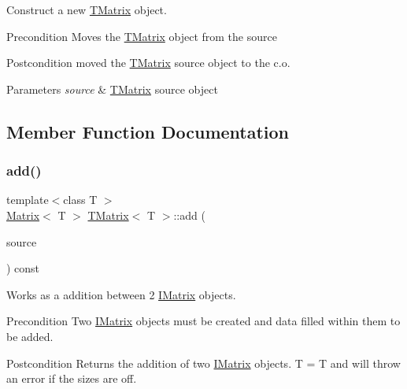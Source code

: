 Construct a new \mbox{\hyperlink{class_t_matrix}{T\+Matrix}} object. 

\begin{DoxyPrecond}{Precondition}
Moves the \mbox{\hyperlink{class_t_matrix}{T\+Matrix}} object from the source 
\end{DoxyPrecond}
\begin{DoxyPostcond}{Postcondition}
moved the \mbox{\hyperlink{class_t_matrix}{T\+Matrix}} source object to the c.\+o.
\end{DoxyPostcond}

\begin{DoxyParams}{Parameters}
{\em source} & \mbox{\hyperlink{class_t_matrix}{T\+Matrix}} source object \\
\hline
\end{DoxyParams}


\subsection{Member Function Documentation}
\mbox{\label{class_t_matrix_a42bd72d405febbf7edcc225a79935800}} 
\subsubsection{\texorpdfstring{add()}{add()}\hspace{0.1cm}{\footnotesize\ttfamily [1/6]}}
{\footnotesize\ttfamily template$<$class T $>$ \\
\mbox{\hyperlink{class_matrix}{Matrix}}$<$ T $>$ \mbox{\hyperlink{class_t_matrix}{T\+Matrix}}$<$ T $>$\+::add (\begin{DoxyParamCaption}\item[{const \mbox{\hyperlink{class_i_matrix}{I\+Matrix}}$<$ \mbox{\hyperlink{class_matrix}{Matrix}}$<$ T $>$, T $>$ \&}]{source }\end{DoxyParamCaption}) const}



Works as a addition between 2 \mbox{\hyperlink{class_i_matrix}{I\+Matrix}} objects. 

\begin{DoxyPrecond}{Precondition}
Two \mbox{\hyperlink{class_i_matrix}{I\+Matrix}} objects must be created and data filled within them to be added. 
\end{DoxyPrecond}
\begin{DoxyPostcond}{Postcondition}
Returns the addition of two \mbox{\hyperlink{class_i_matrix}{I\+Matrix}} objects. T = T and will throw an error if the sizes are off.
\end{DoxyPostcond}

